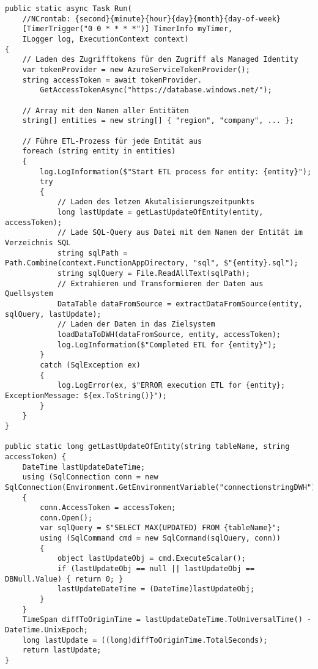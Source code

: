 \lstset{style=sharpc}
\begin{lstlisting}[frame=single,caption=ETL-Prozess: Aufruf der Funktion,captionpos=b]
public static async Task Run(
    //NCrontab: {second}{minute}{hour}{day}{month}{day-of-week}
    [TimerTrigger("0 0 * * * *")] TimerInfo myTimer, 
    ILogger log, ExecutionContext context)
{
    // Laden des Zugrifftokens für den Zugriff als Managed Identity
    var tokenProvider = new AzureServiceTokenProvider();
    string accessToken = await tokenProvider.
        GetAccessTokenAsync("https://database.windows.net/");

    // Array mit den Namen aller Entitäten 
    string[] entities = new string[] { "region", "company", ... };
    
    // Führe ETL-Prozess für jede Entität aus
    foreach (string entity in entities)
    {
        log.LogInformation($"Start ETL process for entity: {entity}");
        try
        {
            // Laden des letzen Akutalisierungszeitpunkts
            long lastUpdate = getLastUpdateOfEntity(entity, accessToken);
            // Lade SQL-Query aus Datei mit dem Namen der Entität im Verzeichnis SQL
            string sqlPath = Path.Combine(context.FunctionAppDirectory, "sql", $"{entity}.sql");
            string sqlQuery = File.ReadAllText(sqlPath);
            // Extrahieren und Transformieren der Daten aus Quellsystem
            DataTable dataFromSource = extractDataFromSource(entity, sqlQuery, lastUpdate);
            // Laden der Daten in das Zielsystem
            loadDataToDWH(dataFromSource, entity, accessToken);
            log.LogInformation($"Completed ETL for {entity}");
        }
        catch (SqlException ex)
        {
            log.LogError(ex, $"ERROR execution ETL for {entity}; ExceptionMessage: ${ex.ToString()}");
        }
    }
}

public static long getLastUpdateOfEntity(string tableName, string accessToken) {
    DateTime lastUpdateDateTime;
    using (SqlConnection conn = new SqlConnection(Environment.GetEnvironmentVariable("connectionstringDWH")))
    {
        conn.AccessToken = accessToken;
        conn.Open();
        var sqlQuery = $"SELECT MAX(UPDATED) FROM {tableName}";
        using (SqlCommand cmd = new SqlCommand(sqlQuery, conn))
        {
            object lastUpdateObj = cmd.ExecuteScalar();
            if (lastUpdateObj == null || lastUpdateObj == DBNull.Value) { return 0; }
            lastUpdateDateTime = (DateTime)lastUpdateObj;
        }
    }
    TimeSpan diffToOriginTime = lastUpdateDateTime.ToUniversalTime() - DateTime.UnixEpoch;
    long lastUpdate = ((long)diffToOriginTime.TotalSeconds);
    return lastUpdate;
}


\end{lstlisting}
